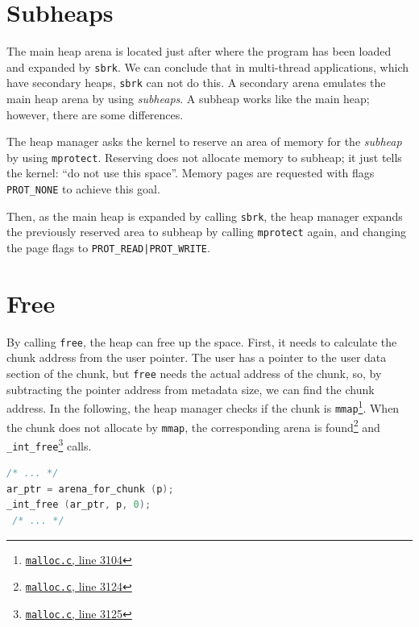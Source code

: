 \documentclass{masterthesis}
\newcommand*\sbrkc{\lstinline{sbrk}\xspace}
\begin{document}
\section{Subheaps}
\label{sect:subheaps}
The main heap arena is located just after where the program has been loaded and expanded by \sbrkc. We can conclude that in multi-thread applications, which have secondary heaps, \sbrkc can not do this. A secondary arena emulates the main heap arena by using \emph{subheaps}. A subheap works like the main heap; however, there are some differences.

The heap manager asks the kernel to reserve an area of memory for the \emph{subheap} by using \lstinline{mprotect}. Reserving does not allocate memory to subheap; it just tells the kernel: ``do not use this space''. Memory pages are requested with flags \lstinline{PROT_NONE} to achieve this goal.

Then, as the main heap is expanded by calling \sbrkc, the heap manager expands the previously reserved area to subheap by calling \lstinline{mprotect} again, and changing the page flags to \lstinline{PROT_READ|PROT_WRITE}.

\section{Free}
By calling \lstinline{free}, the heap can free up the space. First, it needs to calculate the chunk address from the user pointer. The user has a pointer to the user data section of the chunk, but \lstinline{free} needs the actual address of the chunk, so, by subtracting the pointer address from metadata size, we can find the chunk address. In the following, the heap manager checks if the chunk is \lstinline{mmap}\footnote{\href{https://sourceware.org/git/?p=glibc.git;a=blob;f=malloc/malloc.c;h=f7cd29bc2f93e1082ee77800bd64a4b2a2897055;hb=9ea3686266dca3f004ba874745a4087a89682617\#l3104}{\texttt{malloc.c}, line 3104}}. When the chunk does not allocate by \lstinline{mmap}, the corresponding arena is found\footnote{\href{https://sourceware.org/git/?p=glibc.git;a=blob;f=malloc/malloc.c;h=f7cd29bc2f93e1082ee77800bd64a4b2a2897055;hb=9ea3686266dca3f004ba874745a4087a89682617\#l3124}{\texttt{malloc.c}, line 3124}} and \lstinline{_int_free}\footnote{\href{https://sourceware.org/git/?p=glibc.git;a=blob;f=malloc/malloc.c;h=f7cd29bc2f93e1082ee77800bd64a4b2a2897055;hb=9ea3686266dca3f004ba874745a4087a89682617\#l3125}{\texttt{malloc.c}, line 3125}} calls. 

\begin{lstlisting}[language=c,frame=single]
 /* ... */
ar_ptr = arena_for_chunk (p);
_int_free (ar_ptr, p, 0);
 /* ... */
\end{lstlisting}
\end{document}
